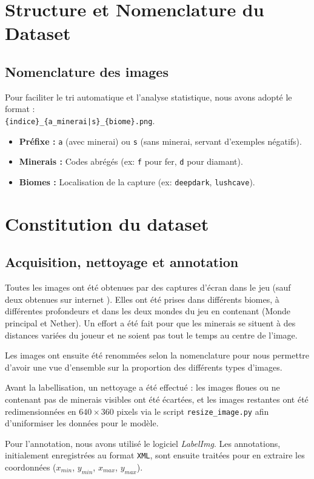 \documentclass{article}
\begin{document}
\section{Structure et Nomenclature du Dataset}

\subsection{Nomenclature des images}
Pour faciliter le tri automatique et l'analyse statistique, nous avons adopté le format :\\
\texttt{\{indice\}\_\{a\_minerai|s\}\_\{biome\}.png}.
\begin{itemize}
    \item \textbf{Préfixe :} \texttt{a} (avec minerai) ou \texttt{s} (sans minerai, servant d'exemples négatifs).
    \item \textbf{Minerais :} Codes abrégés (ex: \texttt{f} pour fer, \texttt{d} pour diamant).
    \item \textbf{Biomes :} Localisation de la capture (ex: \texttt{deepdark}, \texttt{lushcave}).
\end{itemize}

\section{Constitution du dataset}
\subsection{Acquisition, nettoyage et annotation}
Toutes les images ont été obtenues par des captures d'écran dans le jeu (sauf deux obtenues sur internet ). Elles ont été prises dans différents biomes, à différentes profondeurs et dans les deux mondes du jeu en contenant (Monde principal et Nether). Un effort a été fait pour que les minerais se situent à des distances variées du joueur et ne soient pas tout le temps au centre de l'image.

Les images ont ensuite été renommées selon la nomenclature pour nous permettre d'avoir une vue d'ensemble sur la proportion des différents types d'images.

Avant la labellisation, un nettoyage a été effectué : les images floues ou ne contenant pas de minerais visibles ont été écartées, et les images restantes ont été redimensionnées en $640 \times 360$ pixels via le script \texttt{resize\_image.py} afin d'uniformiser les données pour le modèle.

Pour l'annotation, nous avons utilisé le logiciel \textit{LabelImg}. Les annotations, initialement enregistrées au format \texttt{XML}, sont ensuite traitées pour en extraire les coordonnées ($x_{min}$, $y_{min}$, $x_{max}$, $y_{max}$).
\end{document}

